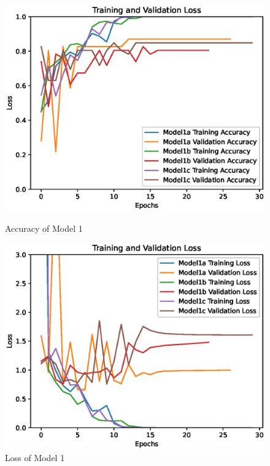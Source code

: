 \begin{figure}[H]
    \centering
    \begin{minipage}{0.49\textwidth}
        \centering
        \includegraphics[width=\textwidth]{./fig/model1/accuracy11.eps}
        \caption{Accuracy of Model 1}
        \label{fig:model11_acc}
    \end{minipage}
    \begin{minipage}{0.49\textwidth}
        \centering
        \includegraphics[width=\textwidth]{./fig/model1/loss11.eps}
        \caption{Loss of Model 1}
        \label{fig:model11_loss}
    \end{minipage}
\end{figure}


